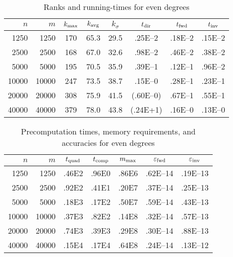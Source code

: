 \documentclass[final,3p,times]{elsarticle}
\def\epsilon{\varepsilon}
\begin{document}
\begin{table}[p]
\caption{Ranks and running-times for even degrees}
\label{evens_time}
\vspace{1em}
\begin{tabular*}{\columnwidth}{@{\extracolsep{\fill}}rrcccccc}
$n$ &   $m$ & $k_{\rm max}$ & $k_{\rm avg}$ & $k_{\sigma}$ & $t_{\rm dir}$ & $t_{\rm fwd}$ & $t_{\rm inv}$ \\\hline
 1250 &  1250 &           170 &          65.3 &         29.5 &       .25E--2 &       .18E--2 &       .15E--2 \\\hline
 2500 &  2500 &           168 &          67.0 &         32.6 &       .98E--2 &       .46E--2 &       .38E--2 \\\hline
 5000 &  5000 &           195 &          70.5 &         35.9 &       .39E--1 &       .12E--1 &       .96E--2 \\\hline
10000 & 10000 &           247 &          73.5 &         38.7 &       .15E--0 &       .28E--1 &       .23E--1 \\\hline
20000 & 20000 &           308 &          75.9 &         41.5 &      (.60E--0)&       .67E--1 &       .55E--1 \\\hline
40000 & 40000 &           379 &          78.0 &         43.8 &       (.24E+1)&       .16E--0 &       .13E--0 \\\hline
\end{tabular*}
\end{table}


\begin{table}[p]
\caption{Precomputation times, memory requirements, and accuracies
         for even degrees}
\label{evens_pre}
\vspace{1em}
\begin{tabular*}{\columnwidth}{@{\extracolsep{\fill}}rrccccc}
$n$ &   $m$ & $t_{\rm quad}$ & $t_{\rm comp}$ & $m_{\rm max}$ & $\epsilon_{\rm fwd}$ & $\epsilon_{\rm inv}$ \\\hline
 1250 &  1250 &          .46E2 &          .96E0 &         .86E6 &             .62E--14 &             .19E--13 \\\hline
 2500 &  2500 &          .92E2 &          .41E1 &         .20E7 &             .37E--14 &             .25E--13 \\\hline
 5000 &  5000 &          .18E3 &          .17E2 &         .50E7 &             .59E--14 &             .43E--13 \\\hline
10000 & 10000 &          .37E3 &          .82E2 &         .14E8 &             .32E--14 &             .57E--13 \\\hline
20000 & 20000 &          .74E3 &          .39E3 &         .29E8 &             .30E--14 &             .88E--13 \\\hline
40000 & 40000 &          .15E4 &          .17E4 &         .64E8 &             .24E--14 &             .13E--12 \\\hline
\end{tabular*}
\end{table}
\end{document}
